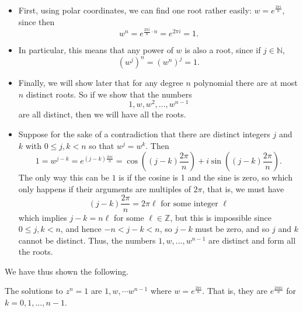 \documentclass[11pt,dvipsnames]{book}
\numberwithin{equation}{section} %
\numberwithin{figure}{section} %
\numberwithin{table}{section} %
\begin{document}
\begin{itemize}
\item First, using polar coordinates, we can find one root rather easily: $w=e^{\frac{2\pi i}{n}}$, since then 
\[
w^{n} = e^{\frac{2\pi i}{n}\cdot n}=e^{2\pi i}=1.\]
\item In particular, this means that any power of $w$ is also a root, since if $j\in\mathbb{N}$, 
\[
(w^{j} )^{n} = (w^{n})^{j}=1.
\]
\item Finally, we will show later that for any degree $n$ polynomial there are at most $n$ distinct roots. So if we show that the numbers
\[
1,w,w^{2},...,w^{n-1}
\]
are all distinct, then we will have all the roots. \\

\item Suppose for the sake of a contradiction that there are distinct integers $j$ and $k$ with $0\leq j,k<n$ so that $w^{j}=w^{k}$. Then
\[
1=w^{j-k}=e^{(j-k)\frac{2\pi i}{n}} = \cos \left((j-k)\frac{2\pi }{n}\right)+i\sin \left((j-k)\frac{2\pi }{n}\right).\]
The only way this can be $1$ is if the cosine is 1 and the sine is zero, so which only happens if their arguments are multiples of $2\pi$, that is, we must have 
\[
(j-k)\frac{2\pi }{n} = 2\pi \ell \mbox{ for some integer }\ell\]
which implies $j-k=n\ell$ for some $\ell\in\mathbb{Z}$, but this is impossible since $0\leq j,k<n$, and hence $-n<j-k<n$, so $j-k$ must be zero, and so $j$ and $k$ cannot be distinct. Thus, the numbers $1,w,...,w^{n-1}$ are distinct and form all the roots.
\end{itemize}

We have thus shown the following.

\begin{theorem}
The solutions to $z^{n}=1$ are $1,w,\cdots w^{n-1}$ where $w=e^{\frac{2\pi i}{n}}$. That is, they are $e^{\frac{2\pi k i}{n}}$ for $k=0,1,...,n-1$.
\end{theorem}
\end{document}
